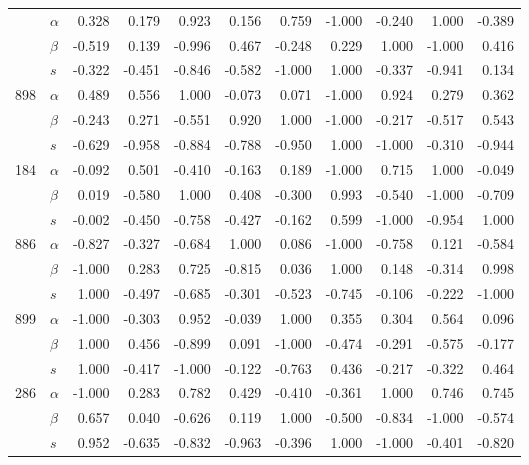 \begin{longtable}{llrrrrrrrrr}
\bottomrule
\endlastfoot
\multirow{3}{*}{491} & $\alpha$ &  0.328 &  0.179 &  0.923 &  0.156 &  0.759 & -1.000 & -0.240 &  1.000 & -0.389 \\
     & $\beta$ & -0.519 &  0.139 & -0.996 &  0.467 & -0.248 &  0.229 &  1.000 & -1.000 &  0.416 \\
     & $s$ & -0.322 & -0.451 & -0.846 & -0.582 & -1.000 &  1.000 & -0.337 & -0.941 &  0.134 \\
\cline{1-11}
\multirow{3}{*}{898} & $\alpha$ &  0.489 &  0.556 &  1.000 & -0.073 &  0.071 & -1.000 &  0.924 &  0.279 &  0.362 \\
     & $\beta$ & -0.243 &  0.271 & -0.551 &  0.920 &  1.000 & -1.000 & -0.217 & -0.517 &  0.543 \\
     & $s$ & -0.629 & -0.958 & -0.884 & -0.788 & -0.950 &  1.000 & -1.000 & -0.310 & -0.944 \\
\cline{1-11}
\multirow{3}{*}{184} & $\alpha$ & -0.092 &  0.501 & -0.410 & -0.163 &  0.189 & -1.000 &  0.715 &  1.000 & -0.049 \\
     & $\beta$ &  0.019 & -0.580 &  1.000 &  0.408 & -0.300 &  0.993 & -0.540 & -1.000 & -0.709 \\
     & $s$ & -0.002 & -0.450 & -0.758 & -0.427 & -0.162 &  0.599 & -1.000 & -0.954 &  1.000 \\
\cline{1-11}
\multirow{3}{*}{886} & $\alpha$ & -0.827 & -0.327 & -0.684 &  1.000 &  0.086 & -1.000 & -0.758 &  0.121 & -0.584 \\
     & $\beta$ & -1.000 &  0.283 &  0.725 & -0.815 &  0.036 &  1.000 &  0.148 & -0.314 &  0.998 \\
     & $s$ &  1.000 & -0.497 & -0.685 & -0.301 & -0.523 & -0.745 & -0.106 & -0.222 & -1.000 \\
\cline{1-11}
\multirow{3}{*}{899} & $\alpha$ & -1.000 & -0.303 &  0.952 & -0.039 &  1.000 &  0.355 &  0.304 &  0.564 &  0.096 \\
     & $\beta$ &  1.000 &  0.456 & -0.899 &  0.091 & -1.000 & -0.474 & -0.291 & -0.575 & -0.177 \\
     & $s$ &  1.000 & -0.417 & -1.000 & -0.122 & -0.763 &  0.436 & -0.217 & -0.322 &  0.464 \\
\cline{1-11}
\multirow{3}{*}{286} & $\alpha$ & -1.000 &  0.283 &  0.782 &  0.429 & -0.410 & -0.361 &  1.000 &  0.746 &  0.745 \\
     & $\beta$ &  0.657 &  0.040 & -0.626 &  0.119 &  1.000 & -0.500 & -0.834 & -1.000 & -0.574 \\
     & $s$ &  0.952 & -0.635 & -0.832 & -0.963 & -0.396 &  1.000 & -1.000 & -0.401 & -0.820 \\

\end{longtable}

